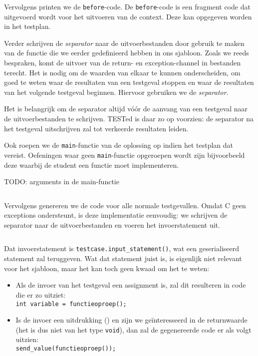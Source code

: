 \inputminted[firstline=33,lastline=36]{mako}{sources/c-context.mako}

Vervolgens printen we de \texttt{before}-code.
De \texttt{before}-code is een fragment code dat uitgevoerd wordt voor het uitvoeren van de context.
Deze kan opgegeven worden in het testplan.

Verder schrijven de \emph{separator} naar de uitvoerbestanden door gebruik te maken van de functie die we eerder gedefinieerd hebben in ons sjabloon.
Zoals we reeds bespraken, komt de uitvoer van de return- en exception-channel in bestanden terecht.
Het is nodig om de waarden van elkaar te kunnen onderscheiden, om goed te weten waar de resultaten van een testgeval stoppen en waar de resultaten van het volgende testgeval beginnen.
Hiervoor gebruiken we de \emph{separator}.

Het is belangrijk om de separator altijd vóór de aanvang van een testgeval naar de uitvoerbestanden te schrijven.
TESTed is daar zo op voorzien: de separator na het testgeval uitschrijven zal tot verkeerde resultaten leiden.

Ook roepen we de \texttt{main}-functie van de oplossing op indien het testplan dat vereist.
Oefeningen waar geen \texttt{main}-functie opgeroepen wordt zijn bijvoorbeeld deze waarbij de student een functie moet implementeren.

TODO: arguments in de main-functie

\inputminted[firstline=38,lastline=44]{mako}{sources/c-context.mako}

Vervolgens genereren we de code voor alle normale testgevallen.
Omdat C geen exceptions ondersteunt, is deze implementatie eenvoudig: we schrijven de separator naar de uitvoerbestanden en voeren het invoerstatement uit.

\inputminted[firstline=47,lastline=51]{mako}{sources/c-context.mako}

Dat invoerstatement is \texttt{testcase.input\_statement()}, wat een geserialiseerd statement zal teruggeven.
Wat dat statement juist is, is eigenlijk niet relevant voor het sjabloon, maar het kan toch geen kwaad om het te weten:

\begin{itemize}
    \item Als de invoer van het testgeval een assignment is, zal dit resulteren in code die er zo uitziet: \\
    \texttt{int variable = functieoproep();}
    
    \item Is de invoer een uitdrukking () en zijn we geïnteresseerd in de returnwaarde (het is dus niet van het type \texttt{void}), dan zal de gegenereerde code er als volgt uitzien: \\
    \texttt{send_value(functieoproep());}
\end{itemize}

